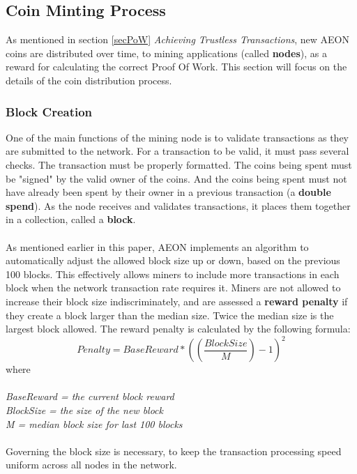 \subsection{Coin Minting Process}
As mentioned in section \ref{secPoW} \textit{Achieving Trustless Transactions}, new AEON coins are distributed over time, to mining applications (called \textbf{nodes}), as a reward for calculating the correct Proof Of Work. This section will focus on the details of the coin distribution process.

\subsubsection{Block Creation}
One of the main functions of the mining node is to validate transactions as they are submitted to the network. For a transaction to be valid, it must pass several checks. The transaction must be properly formatted. The coins being spent must be "signed" by the valid owner of the coins. And the coins being spent must not have already been spent by their owner in a previous transaction (a \textbf{double spend}). As the node receives and validates transactions, it places them together in a collection, called a \textbf{block}.\\
\\
As mentioned earlier in this paper, AEON implements an algorithm to automatically adjust the allowed block size up or down, based on the previous 100 blocks.  This effectively allows miners to include more transactions in each block when the network transaction rate requires it. Miners are not allowed to increase their block size indiscriminately, and are assessed a \textbf{reward penalty} if they create a block larger than the median size. Twice the median size is the largest block allowed. The reward penalty is calculated by the following formula:
\begin{equation*}
Penalty = BaseReward * ( (\frac{BlockSize}{M}) - 1 )^2 
\end{equation*}
where\\
\\
\textit{
BaseReward = the current block reward\\
BlockSize = the size of the new block\\
M = median block size for last 100 blocks}\\
\\
Governing the block size is necessary, to keep the transaction processing speed uniform across all nodes in the network.

